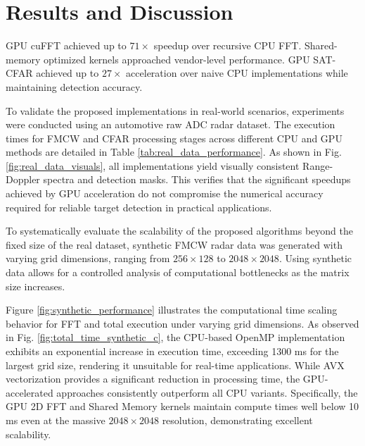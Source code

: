 \documentclass[conference, a4paper]{IEEEtran}
\begin{document}
\section{Results and Discussion}

GPU cuFFT achieved up to $71\times$ speedup over recursive CPU FFT. Shared-memory optimized kernels approached vendor-level performance. GPU SAT-CFAR achieved up to $27\times$ acceleration over naive CPU implementations while maintaining detection accuracy. 

To validate the proposed implementations in real-world scenarios, experiments were conducted using an automotive raw ADC radar dataset\cite{xm40-jx59-22}. The execution times for FMCW and CFAR processing stages across different CPU and GPU methods are detailed in Table \ref{tab:real_data_performance}. As shown in Fig. \ref{fig:real_data_visuals}, all implementations yield visually consistent Range-Doppler spectra and detection masks. This verifies that the significant speedups achieved by GPU acceleration do not compromise the numerical accuracy required for reliable target detection in practical applications.

\begin{table}[htbp]
 \centering
 \caption{Execution Times on Real Automotive Radar Dataset}
 \renewcommand{\arraystretch}{1.2}
\label{tab:real_data_performance}
\end{table}

To systematically evaluate the scalability of the proposed algorithms beyond the fixed size of the real dataset, synthetic FMCW radar data was generated with varying grid dimensions, ranging from $256 \times 128$ to $2048 \times 2048$. Using synthetic data allows for a controlled analysis of computational bottlenecks as the matrix size increases. 

Figure \ref{fig:synthetic_performance} illustrates the computational time scaling behavior for FFT and total execution under varying grid dimensions. As observed in Fig. \ref{fig:total_time_synthetic_c}, the CPU-based OpenMP implementation exhibits an exponential increase in execution time, exceeding 1300 ms for the largest grid size, rendering it unsuitable for real-time applications. While AVX vectorization provides a significant reduction in processing time, the GPU-accelerated approaches consistently outperform all CPU variants. Specifically, the GPU 2D FFT and Shared Memory kernels maintain compute times well below 10 ms even at the massive $2048 \times 2048$ resolution, demonstrating excellent scalability.
\end{document}
